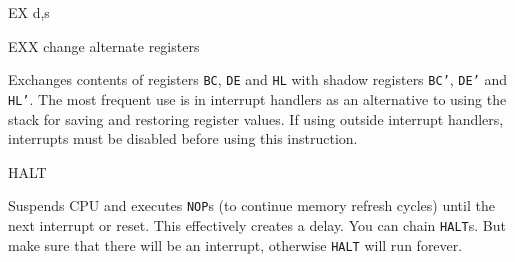 \begin{basedescript}{
	\desclabelstyle{\multilinelabel}
	\desclabelwidth{3cm}}
\begin{DetailItem}{EX d,s}
		\begin{DetailEffects}
			\FlagsEXrr[No effect]
			\FlagsEXaf[{\tt EX AF,AF'}]
		\end{DetailEffects}
						
		\begin{DetailTiming}
			\DetailTime[rr,rr]{1}{4}
			\DetailTime[(SP),HL]{5}{19}
			\DetailTime[(SP),IX]{6}{23}
			\DetailTime[(SP),IY]{6}{23}
		\end{DetailTiming}

	\end{DetailItem}

	\begin{DetailItem}{EXX}
		{change alternate registers}
		{\SymEXX}

		Exchanges contents of registers {\tt BC}, {\tt DE} and {\tt HL} with shadow registers {\tt BC'}, {\tt DE'} and {\tt HL'}. The most frequent use is in interrupt handlers as an alternative to using the stack for saving and restoring register values. If using outside interrupt handlers, interrupts must be disabled before using this instruction.

		\begin{DetailEffects}
			\FlagsEXX
		\end{DetailEffects}
				
		\begin{DetailTiming}
			\DetailTime{1}{4}
		\end{DetailTiming}

	\end{DetailItem}

	\pagebreak
	\begin{DetailItem}{HALT}
		{\IH{HALT}}
		{}

		Suspends CPU and executes {\tt NOP}s (to continue memory refresh cycles) until the next interrupt or reset. This effectively creates a delay. You can chain {\tt HALT}s. But make sure that there will be an interrupt, otherwise {\tt HALT} will run forever.

		\begin{DetailEffects}
			\FlagsHALT
		\end{DetailEffects}
						
		\begin{DetailTiming}
		\end{DetailTiming}

	\end{DetailItem}


\end{basedescript}
